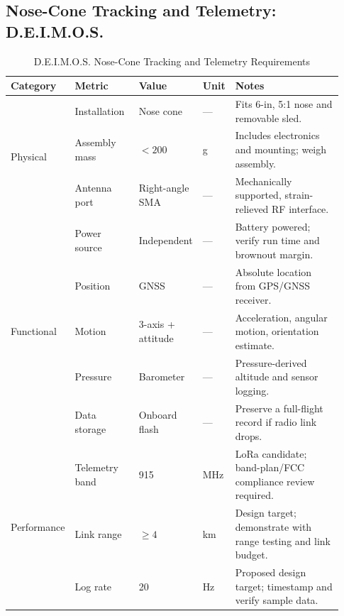 \documentclass[11pt]{IEEEtran}
\newcommand{\deimos}{D.E.I.M.O.S.}
\begin{document}
\subsection{Nose-Cone Tracking and Telemetry: \deimos{}}
\begin{table}[H]
\centering\small
\begin{tabular}{@{}p{0.13\linewidth}p{0.20\linewidth}p{0.13\linewidth}p{0.08\linewidth}p{0.39\linewidth}@{}}
\toprule
\textbf{Category} & \textbf{Metric} & \textbf{Value} & \textbf{Unit} & \textbf{Notes}\\
\midrule
\multirow{3}{*}{Physical}
 & Installation & Nose cone & --- & Fits 6-in, 5:1 nose and removable sled.\\ \cmidrule{2-5}
 & Assembly mass & $<200$ & g & Includes electronics and mounting; weigh assembly.\\ \cmidrule{2-5}
 & Antenna port & Right-angle SMA & --- & Mechanically supported, strain-relieved RF interface.\\
\midrule
\multirow{5}{*}{Functional}
 & Power source & Independent & --- & Battery powered; verify run time and brownout margin.\\ \cmidrule{2-5}
 & Position & GNSS & --- & Absolute location from GPS/GNSS receiver.\\ \cmidrule{2-5}
 & Motion & 3-axis + attitude & --- & Acceleration, angular motion, orientation estimate.\\ \cmidrule{2-5}
 & Pressure & Barometer & --- & Pressure-derived altitude and sensor logging.\\ \cmidrule{2-5}
 & Data storage & Onboard flash & --- & Preserve a full-flight record if radio link drops.\\
\midrule
\multirow{3}{*}{Performance}
 & Telemetry band & 915 & MHz & LoRa candidate; band-plan/FCC compliance review required.\\ \cmidrule{2-5}
 & Link range & $\geq4$ & km & Design target; demonstrate with range testing and link budget.\\ \cmidrule{2-5}
 & Log rate & 20 & Hz & Proposed design target; timestamp and verify sample data.\\
\bottomrule
\end{tabular}
\vspace{3mm}
\caption{\deimos{} Nose-Cone Tracking and Telemetry Requirements}
\label{tab:DEIMOS_Requirements_Table}
\end{table}
\end{document}
